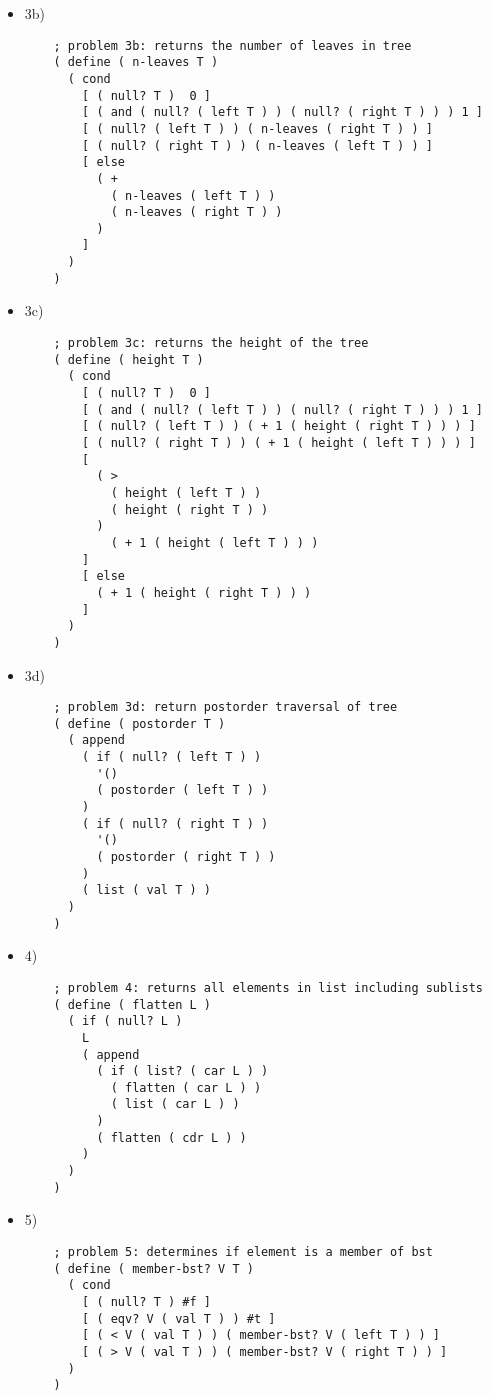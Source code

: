 \documentclass[ 12pt ]{article}
\begin{document}
\begin{itemize}
  \item[] {\large 3b)}
  \newline
  \begin{lstlisting}
    ; problem 3b: returns the number of leaves in tree
    ( define ( n-leaves T )
      ( cond
        [ ( null? T )  0 ]
        [ ( and ( null? ( left T ) ) ( null? ( right T ) ) ) 1 ]
        [ ( null? ( left T ) ) ( n-leaves ( right T ) ) ]
        [ ( null? ( right T ) ) ( n-leaves ( left T ) ) ]
        [ else
          ( +
            ( n-leaves ( left T ) )
            ( n-leaves ( right T ) )
          )
        ]
      )
    )
  \end{lstlisting}

  \item[] {\large 3c)}
  \begin{lstlisting}
    ; problem 3c: returns the height of the tree
    ( define ( height T )
      ( cond
        [ ( null? T )  0 ]
        [ ( and ( null? ( left T ) ) ( null? ( right T ) ) ) 1 ]
        [ ( null? ( left T ) ) ( + 1 ( height ( right T ) ) ) ]
        [ ( null? ( right T ) ) ( + 1 ( height ( left T ) ) ) ]
        [
          ( >
            ( height ( left T ) )
            ( height ( right T ) )
          )
            ( + 1 ( height ( left T ) ) )
        ]
        [ else
          ( + 1 ( height ( right T ) ) )
        ]
      )
    )
  \end{lstlisting}
  \newpage

  \item[] {\large 3d)}
  \begin{lstlisting}
    ; problem 3d: return postorder traversal of tree
    ( define ( postorder T )
      ( append
        ( if ( null? ( left T ) )
          '()
          ( postorder ( left T ) )
        )
        ( if ( null? ( right T ) )
          '()
          ( postorder ( right T ) )
        )
        ( list ( val T ) )
      )
    )
  \end{lstlisting}

  \item[] {\large 4)}
  \begin{lstlisting}
    ; problem 4: returns all elements in list including sublists
    ( define ( flatten L )
      ( if ( null? L )
        L
        ( append
          ( if ( list? ( car L ) )
            ( flatten ( car L ) )
            ( list ( car L ) )
          )
          ( flatten ( cdr L ) )
        )
      )
    )
  \end{lstlisting}

  \item[] {\large 5)}
  \begin{lstlisting}
    ; problem 5: determines if element is a member of bst
    ( define ( member-bst? V T )
      ( cond
        [ ( null? T ) #f ]
        [ ( eqv? V ( val T ) ) #t ]
        [ ( < V ( val T ) ) ( member-bst? V ( left T ) ) ]
        [ ( > V ( val T ) ) ( member-bst? V ( right T ) ) ]
      )
    )
  \end{lstlisting}
\end{itemize}
\end{document}
